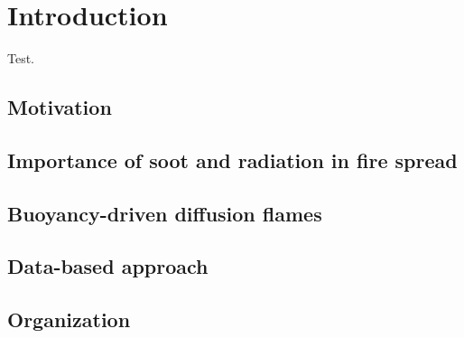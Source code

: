 \addchapheadtotoc

\chapter{Introduction}
Test.


\section{Motivation}


\section{Importance of soot and radiation in fire spread}
 

\section{Buoyancy-driven diffusion flames}
\section{Data-based approach}

\section{Organization}
